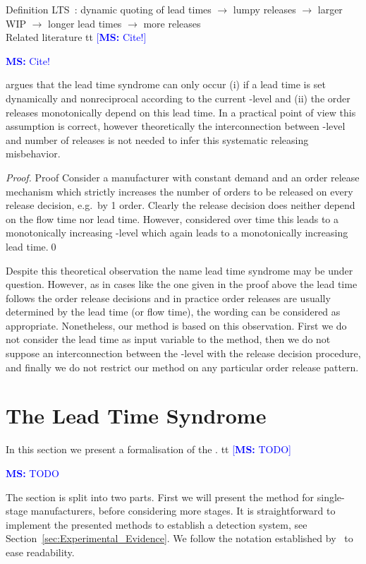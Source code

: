 \documentclass[mnsc]{informs3}
\newcommand\MS[2][r]{\ifx t#1 \textcolor{blue}{[\textbf{MS:} #2]}
  \else \begin{center}\textcolor{blue}{\textbf{MS:} #2} \end{center} \fi}
\begin{document}
Definition LTS~\citep{selccuk2013adaptive}: dynamic quoting of lead times $\rightarrow$ lumpy releases $\rightarrow$ larger
WIP $\rightarrow$ longer lead times $\rightarrow$ more releases\\


Related literature \MS[t]{Cite!} argues that the lead time syndrome can only occur (i) if a lead
time is set dynamically and nonreciprocal according to the current \WIP{}-level and (ii) the order
releases monotonically depend on this lead time. In a practical point of view this assumption is
correct, however theoretically the interconnection between \WIP{}-level and number of releases is
not needed to infer this systematic releasing misbehavior.

\begin{proof}{Proof}
  Consider a manufacturer with constant demand and an order release mechanism which strictly
  increases the number of orders to be released on every release decision, e.g.~by 1 order. Clearly
  the release decision does neither depend on the flow time nor lead time. However, considered over
  time this leads to a monotonically increasing \WIP{}-level which again leads to a monotonically
  increasing lead time.\qed
\end{proof}

Despite this theoretical observation the name lead time syndrome may be under question. However, as
in cases like the one given in the proof above the lead time follows the order release decisions and
in practice order releases are usually determined by the lead time (or flow time), the wording can
be considered as appropriate.
%
Nonetheless, our method is based on this observation. First we do not consider the lead time as
input variable to the method, then we do not suppose an interconnection between the \WIP{}-level
with the release decision procedure, and finally we do not restrict our method on any particular
order release pattern.


\section{The Lead Time Syndrome}
\label{sec:The_Lead_Time_Syndrome}

In this section we present a formalisation of the \LTS{}.
%
\MS[t]{TODO} The section is split into two
parts. First we will present the method for single-stage manufacturers, before considering more
stages.
%
It is straightforward to implement the presented methods to establish a \LTS{} detection system, see
Section~\ref{sec:Experimental_Evidence}. We follow the notation established
by~\cite{selccuk2013adaptive} to ease readability.
\end{document}
